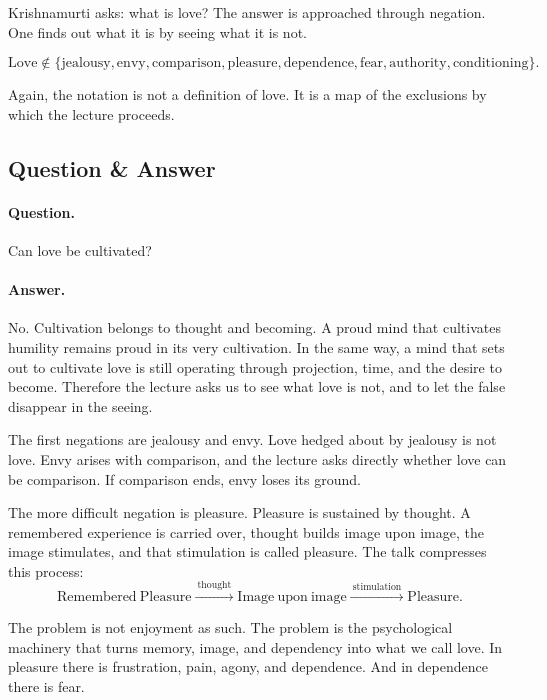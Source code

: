 Krishnamurti asks: what is love? The answer is approached through negation. One finds out what it is by seeing what it is not.

\begin{equation}
\mathrm{Love} \notin
\{\mathrm{jealousy},\mathrm{envy},\mathrm{comparison},\mathrm{pleasure},
\mathrm{dependence},\mathrm{fear},\mathrm{authority},\mathrm{conditioning}\}.
\end{equation}

Again, the notation is not a definition of love. It is a map of the exclusions by which the lecture proceeds.

\subsection{Question \& Answer}

\paragraph{Question.}
Can love be cultivated?

\paragraph{Answer.}
No. Cultivation belongs to thought and becoming. A proud mind that cultivates humility remains proud in its very cultivation. In the same way, a mind that sets out to cultivate love is still operating through projection, time, and the desire to become. Therefore the lecture asks us to see what love is not, and to let the false disappear in the seeing.

The first negations are jealousy and envy. Love hedged about by jealousy is not love. Envy arises with comparison, and the lecture asks directly whether love can be comparison. If comparison ends, envy loses its ground.

The more difficult negation is pleasure. Pleasure is sustained by thought. A remembered experience is carried over, thought builds image upon image, the image stimulates, and that stimulation is called pleasure. The talk compresses this process:
\begin{equation}
\mathrm{Remembered\ Pleasure}
\xrightarrow{\ \mathrm{thought}\ }
\mathrm{Image\ upon\ image}
\xrightarrow{\ \mathrm{stimulation}\ }
\mathrm{Pleasure}.
\end{equation}

The problem is not enjoyment as such. The problem is the psychological machinery that turns memory, image, and dependency into what we call love. In pleasure there is frustration, pain, agony, and dependence. And in dependence there is fear.


